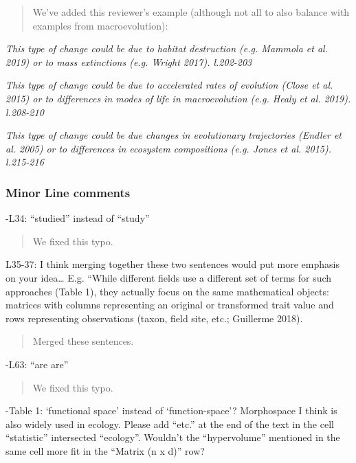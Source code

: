 \documentclass[]{article}
\begin{document}
\begin{quote}
We've added this reviewer's example (although not all to also balance
with examples from macroevolution):
\end{quote}

\textit{This type of change could be due to habitat destruction (e.g. Mammola et
al. 2019) or to mass extinctions (e.g. Wright 2017). l.202-203}

\textit{This type of change could be due to accelerated rates of evolution
(Close et al. 2015) or to differences in modes of life in macroevolution
(e.g. Healy et al. 2019). l.208-210}

\textit{This type of change could be due changes in evolutionary trajectories
(Endler et al. 2005) or to differences in ecosystem compositions (e.g.
Jones et al. 2015). l.215-216}
















\subsubsection{Minor Line comments}\label{minor-line-comments}

-L34: ``studied'' instead of ``study''

\begin{quote}
We fixed this typo.
\end{quote}

L35-37: I think merging together these two sentences would put more
emphasis on your idea\ldots{} E.g. ``While different fields use a
different set of terms for such approaches (Table 1), they actually
focus on the same mathematical objects: matrices with columns
representing an original or transformed trait value and rows
representing observations (taxon, field site, etc.; Guillerme 2018).

\begin{quote}
Merged these sentences.
\end{quote}

-L63: ``are are''

\begin{quote}
We fixed this typo.
\end{quote}

-Table 1: `functional space' instead of `function-space'? Morphospace I
think is also widely used in ecology. Please add ``etc.'' at the end of
the text in the cell ``statistic'' intersected ``ecology''. Wouldn't the
``hypervolume'' mentioned in the same cell more fit in the ``Matrix (n x
d)'' row?
\end{document}
